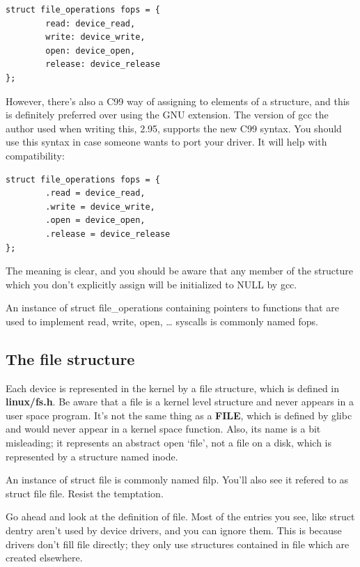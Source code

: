 \documentclass[11pt]{article}
\begin{document}
\begin{verbatim}
struct file_operations fops = {
        read: device_read,
        write: device_write,
        open: device_open,
        release: device_release
};
\end{verbatim}

However, there's also a C99 way of assigning to elements of a structure, and this is definitely preferred over using the GNU extension. The version of gcc the author used when writing this, 2.95, supports the new C99 syntax. You should use this syntax in case someone wants to port your driver. It will help with compatibility:

\begin{verbatim}
struct file_operations fops = {
        .read = device_read,
        .write = device_write,
        .open = device_open,
        .release = device_release
};
\end{verbatim}

The meaning is clear, and you should be aware that any member of the structure which you don't explicitly assign will be initialized to NULL by gcc.

An instance of struct file\_operations containing pointers to functions that are used to implement read, write, open, \ldots{} syscalls is commonly named fops.

\subsection*{The file structure}
\label{sec:org3edaadf}

Each device is represented in the kernel by a file structure, which is defined in \textbf{linux/fs.h}. Be aware that a file is a kernel level structure and never appears in a user space program. It's not the same thing as a \textbf{FILE}, which is defined by glibc and would never appear in a kernel space function. Also, its name is a bit misleading; it represents an abstract open `file', not a file on a disk, which is represented by a structure named inode.

An instance of struct file is commonly named filp. You'll also see it refered to as struct file file. Resist the temptation.

Go ahead and look at the definition of file. Most of the entries you see, like struct dentry aren't used by device drivers, and you can ignore them. This is because drivers don't fill file directly; they only use structures contained in file which are created elsewhere.
\end{document}
